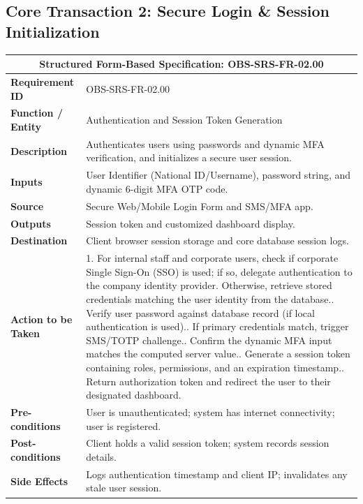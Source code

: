 \documentclass[11pt,a4paper]{article}
\begin{document}
\newpage

\subsection{Core Transaction 2: Secure Login \& Session Initialization}
\begin{center}
\small
\singlespacing
\begin{tabular}{p{4.0cm} p{11.0cm}}
\toprule
\multicolumn{2}{c}{\textbf{Structured Form-Based Specification: OBS-SRS-FR-02.00}} \\ \midrule
\textbf{Requirement ID} & OBS-SRS-FR-02.00 \\ \midrule
\textbf{Function / Entity} & Authentication and Session Token Generation \\ \midrule
\textbf{Description} & Authenticates users using passwords and dynamic MFA verification, and initializes a secure user session. \\ \midrule
\textbf{Inputs} & User Identifier (National ID/Username), password string, and dynamic 6-digit MFA OTP code. \\ \midrule
\textbf{Source} & Secure Web/Mobile Login Form and SMS/MFA app. \\ \midrule
\textbf{Outputs} & Session token and customized dashboard display. \\ \midrule
\textbf{Destination} & Client browser session storage and core database session logs. \\ \midrule
\textbf{Action to be Taken} & 
1. For internal staff and corporate users, check if corporate Single Sign-On (SSO) is used; if so, delegate authentication to the company identity provider. Otherwise, retrieve stored credentials matching the user identity from the database.\newline
2. Verify user password against database record (if local authentication is used).\newline
3. If primary credentials match, trigger SMS/TOTP challenge.\newline
4. Confirm the dynamic MFA input matches the computed server value.\newline
5. Generate a session token containing roles, permissions, and an expiration timestamp.\newline
6. Return authorization token and redirect the user to their designated dashboard. \\ \midrule
\textbf{Pre-conditions} & User is unauthenticated; system has internet connectivity; user is registered. \\ \midrule
\textbf{Post-conditions} & Client holds a valid session token; system records session details. \\ \midrule
\textbf{Side Effects} & Logs authentication timestamp and client IP; invalidates any stale user session. \\ \bottomrule
\end{tabular}
\end{center}
\end{document}
